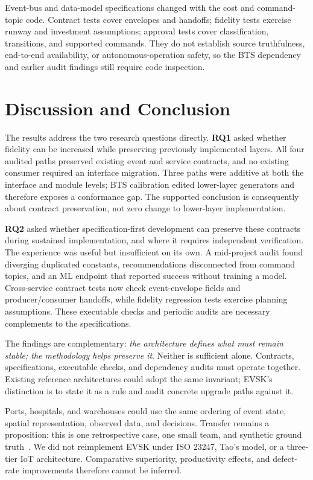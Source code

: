 \documentclass[runningheads]{llncs}
\begin{document}
Event-bus and data-model specifications changed with the cost and command-topic code. Contract tests cover envelopes and handoffs; fidelity tests exercise runway and investment assumptions; approval tests cover classification, transitions, and supported commands. They do not establish source truthfulness, end-to-end availability, or autonomous-operation safety, so the BTS dependency and earlier audit findings still require code inspection.

\section{Discussion and Conclusion}\label{sec:discussion}

The results address the two research questions directly. \textbf{RQ1} asked whether fidelity can be increased while preserving previously implemented layers. All four audited paths preserved existing event and service contracts, and no existing consumer required an interface migration. Three paths were additive at both the interface and module levels; BTS calibration edited lower-layer generators and therefore exposes a conformance gap. The supported conclusion is consequently about contract preservation, not zero change to lower-layer implementation.

\textbf{RQ2} asked whether specification-first development can preserve these contracts during sustained implementation, and where it requires independent verification. The experience was useful but insufficient on its own. A mid-project audit found diverging duplicated constants, recommendations disconnected from command topics, and an ML endpoint that reported success without training a model. Cross-service contract tests now check event-envelope fields and producer/consumer handoffs, while fidelity regression tests exercise planning assumptions. These executable checks and periodic audits are necessary complements to the specifications.

The findings are complementary: \emph{the architecture defines what must remain stable; the methodology helps preserve it}. Neither is sufficient alone. Contracts, specifications, executable checks, and dependency audits must operate together. Existing reference architectures could adopt the same invariant; EVSK's distinction is to state it as a rule and audit concrete upgrade paths against it.

Ports, hospitals, and warehouses could use the same ordering of event state, spatial representation, observed data, and decisions. Transfer remains a proposition: this is one retrospective case, one small team, and synthetic ground truth~\cite{runeson2009}. We did not reimplement EVSK under ISO 23247, Tao's model, or a three-tier IoT architecture. Comparative superiority, productivity effects, and defect-rate improvements therefore cannot be inferred.
\end{document}

